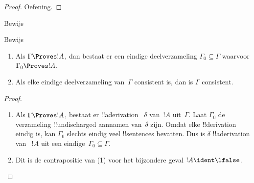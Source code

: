 \documentclass[../../../include/open-logic-section]{subfiles}
\begin{document}
\begin{proof}
Oefening.
\end{proof}

\begin{prob}
Bewijs 
\end{prob}
\tagendprob

\begin{prob}
Bewijs 
\end{prob}
\tagendprob

\begin{prop}[Compactheid]
  \begin{enumerate}
  \item Als $\Gamma \Proves !A$, dan bestaat er een eindige
    deelverzameling $\Gamma_0 \subseteq \Gamma$ waarvoor
    $\Gamma_0 \Proves !A$.
  \item Als elke eindige deelverzameling van~$\Gamma$ consistent is,
    dan is $\Gamma$ consistent.
  \end{enumerate}
\end{prop}

\begin{proof}
  \begin{enumerate}
    \item Als $\Gamma \Proves !A$, bestaat er !!a{derivation}
      ~$\delta$ van~$!A$ uit~$\Gamma$. Laat $\Gamma_0$ de verzameling
      !!{undischarged} aannamen van~$\delta$ zijn. Omdat elke
      !!{derivation} eindig is, kan $\Gamma_0$ slechts eindig veel
      !!{sentence}s bevatten. Dus is $\delta$ !!a{derivation} van
      ~$!A$ uit een eindige~$\Gamma_0 \subseteq \Gamma$.
    \item Dit is de contrapositie van (1) voor het bijzondere geval
      $!A \ident \lfalse$.
  \end{enumerate}
\end{proof}
\end{document}
